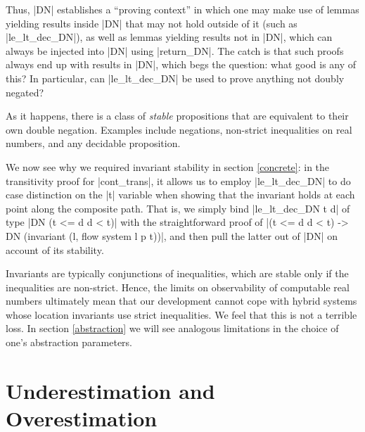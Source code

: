\documentclass[runningheads]{llncs}
\begin{document}
Thus, |DN| establishes a ``proving context'' in which one may make use of lemmas yielding results inside |DN| that may not hold outside of it (such as |le_lt_dec_DN|), as well as lemmas yielding results not in |DN|, which can always be injected into |DN| using |return_DN|. The catch is that such proofs always end up with results in |DN|, which begs the question: what good is any of this? In particular, can |le_lt_dec_DN| be used to prove anything not doubly negated?

As it happens, there is a class of \emph{stable} propositions that are equivalent to their own double negation. Examples include negations, non-strict inequalities on real numbers, and any decidable proposition.

We now see why we required invariant stability in section \ref{concrete}: in the transitivity proof for |cont_trans|, it allows us to employ |le_lt_dec_DN| to do case distinction on the |t| variable when showing that the invariant holds at each point along the composite path. That is, we simply bind |le_lt_dec_DN t d| of type |DN (t <= d \/ d < t)| with the straightforward proof of |(t <= d \/ d < t) -> DN (invariant (l, flow system l p t))|, and then pull the latter out of |DN| on account of its stability.

Invariants are typically conjunctions of inequalities, which are stable only if the inequalities are non-strict. Hence, the limits on observability of computable real numbers ultimately mean that our development cannot cope with hybrid systems whose location invariants use strict inequalities. We feel that this is not a terrible loss. In section \ref{abstraction} we will see analogous limitations in the choice of one's abstraction parameters.



\section{Underestimation and Overestimation}
\label{estimation}
\end{document}
